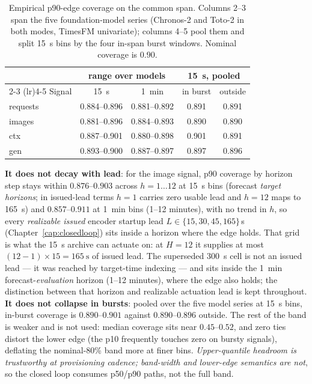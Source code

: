 \begin{table}[htbp]
\centering
\caption[p90 coverage at provisioning cadence]{Empirical p90-edge coverage
on the common span. Columns 2--3 span the five foundation-model series
(Chronos-2 and Toto-2 in both modes, TimesFM univariate); columns 4--5 pool
them and split \SI{15}{\second} bins by the four in-span burst windows.
Nominal coverage is $0.90$.}
\label{tab:pred-coverage}
\small
\begin{tabular}{lcccc}
\toprule
& \multicolumn{2}{c}{range over models} & \multicolumn{2}{c}{\SI{15}{\second}, pooled} \\
\cmidrule(lr){2-3} \cmidrule(lr){4-5}
Signal & \SI{15}{\second} & \SI{1}{\minute} & in burst & outside \\
\midrule
requests & 0.884--0.896 & 0.881--0.892 & 0.891 & 0.891 \\
images   & 0.881--0.896 & 0.884--0.893 & 0.890 & 0.890 \\
ctx      & 0.887--0.901 & 0.880--0.898 & 0.901 & 0.891 \\
gen      & 0.893--0.900 & 0.887--0.897 & 0.897 & 0.896 \\
\bottomrule
\end{tabular}
\end{table}

\textbf{It does not decay with lead}: for the image signal, p90 coverage by
horizon step stays within $0.876$--$0.903$ across $h{=}1\ldots12$ at
\SI{15}{\second} bins (forecast \emph{target horizons}; in issued-lead
terms $h{=}1$ carries zero usable lead and $h{=}12$ maps to
\SI{165}{\second}) and
$0.857$--$0.911$ at \SI{1}{\minute} bins (1--12 minutes), with no trend in
$h$, so every \emph{realizable issued} encoder startup lead $L \in
\{15,30,45,165\}$\,\si{\second} (Chapter~\ref{cap:closedloop}) sits inside a
horizon where the edge holds. That grid is what the \SI{15}{\second} archive
can actuate on: at $H{=}12$ it supplies at most
$(12{-}1)\times15 = \SI{165}{\second}$ of issued lead. The superseded
\SI{300}{\second} cell is not an issued lead --- it was reached by target-time
indexing --- and sits inside the \SI{1}{\minute} forecast-\emph{evaluation}
horizon (1--12 minutes), where the edge also holds; the distinction between
that horizon and realizable actuation lead is kept throughout.
\textbf{It does not collapse in bursts}:
pooled over the five model series at \SI{15}{\second} bins, in-burst
coverage is $0.890$--$0.901$ against
$0.890$--$0.896$ outside. The rest of the band is weaker and is not used:
median coverage sits near $0.45$--$0.52$, and zero ties distort the lower
edge (the p10 frequently touches zero on bursty signals), deflating the
nominal-80\% band more at finer bins. \emph{Upper-quantile headroom is
trustworthy at provisioning cadence; band-width and lower-edge semantics
are not}, so the closed loop consumes p50/p90 paths, not the full band.

